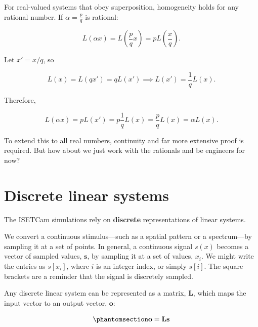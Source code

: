 \documentclass[
  letterpaper,
]{book}
\begin{document}
\begin{tcolorbox}[enhanced jigsaw, titlerule=0mm, colback=white, left=2mm, colframe=quarto-callout-note-color-frame, breakable, rightrule=.15mm, bottomtitle=1mm, title=\textcolor{quarto-callout-note-color}{\faInfo}\hspace{0.5em}{Extension to Rational Numbers}, opacitybacktitle=0.6, toprule=.15mm, colbacktitle=quarto-callout-note-color!10!white, toptitle=1mm, coltitle=black, arc=.35mm, leftrule=.75mm, opacityback=0, bottomrule=.15mm]

For real-valued systems that obey superposition, homogeneity holds for
any rational number. If \(\alpha = \frac{p}{q}\) is rational:

\[
L(\alpha x) = L\left(\frac{p}{q}x\right) = p L\left(\frac{x}{q}\right).
\]

Let \(x' = x/q\), so

\[
L(x) = L(q x') = q L(x') \implies L(x') = \frac{1}{q} L(x).
\]

Therefore,

\[
L(\alpha x) = p L(x') = p \frac{1}{q} L(x) = \frac{p}{q} L(x) = \alpha L(x).
\]

To extend this to all real numbers, continuity and far more extensive
proof is required. But how about we just work with the rationals and be
engineers for now?

\end{tcolorbox}

\section{Discrete linear systems}\label{sec-ls-discrete}

The ISETCam simulations rely on \textbf{discrete} representations of
linear systems.

We convert a continuous stimulus---such as a spatial pattern or a
spectrum---by sampling it at a set of points. In general, a continuous
signal \(s(x)\) becomes a vector of sampled values, \(\mathbf{s}\), by
sampling it at a set of values, \(x_i\). We might write the entries as
\(s[x_i]\), where \(i\) is an integer index, or simply \(s[i]\). The
square brackets are a reminder that the signal is discretely sampled.

Any discrete linear system can be represented as a matrix,
\(\mathbf{L}\), which maps the input vector to an output vector,
\(\mathbf{o}\):

\begin{equation}\phantomsection\label{eq-linear-matrix}{
\mathbf{o} = \mathbf{L} \mathbf{s}
}\end{equation}
\end{document}

